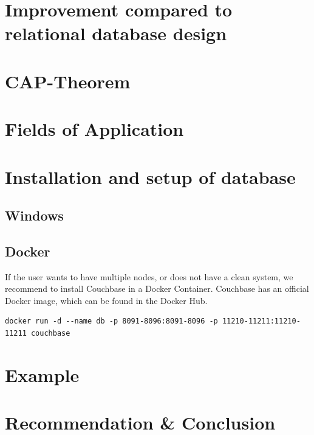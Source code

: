 \section{Improvement compared to relational database design}

\section{\ac{CAP}-Theorem}

\section{Fields of Application}

\section{Installation and setup of database}

\subsection{Windows}


\subsection{Docker}
If the user wants to have multiple nodes, or does not have a clean system, we recommend to install Couchbase in a Docker Container. Couchbase has an official Docker image, which can be found in the Docker Hub.

\begin{lstlisting}
docker run -d --name db -p 8091-8096:8091-8096 -p 11210-11211:11210-11211 couchbase
\end{lstlisting}


\section{Example}

\section{Recommendation \& Conclusion}